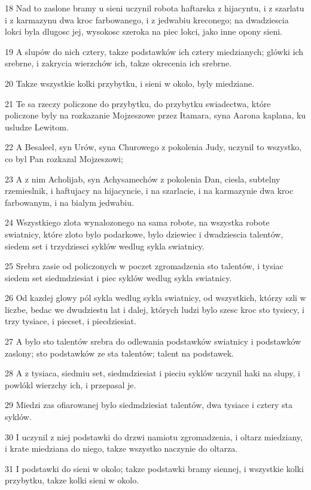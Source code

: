 \par 18 Nad to zaslone bramy u sieni uczynil robota haftarska z hijacyntu, i z szarlatu i z karmazynu dwa kroc farbowanego, i z jedwabiu kreconego; na dwadziescia lokci byla dlugosc jej, wysokosc szeroka na piec lokci, jako inne opony sieni.
\par 19 A slupów do nich cztery, takze podstawków ich cztery miedzianych; glówki ich srebrne, i zakrycia wierzchów ich, takze okrecenia ich srebrne.
\par 20 Takze wszystkie kolki przybytku, i sieni w okolo, byly miedziane.
\par 21 Te sa rzeczy policzone do przybytku, do przybytku swiadectwa, które policzone byly na rozkazanie Mojzeszowe przez Itamara, syna Aarona kaplana, ku usludze Lewitom.
\par 22 A Besaleel, syn Urów, syna Churowego z pokolenia Judy, uczynil to wszystko, co byl Pan rozkazal Mojzeszowi;
\par 23 A z nim Acholijab, syn Achysamechów z pokolenia Dan, ciesla, subtelny rzemieslnik, i haftujacy na hijacyncie, i na szarlacie, i na karmazynie dwa kroc farbowanym, i na bialym jedwabiu.
\par 24 Wszystkiego zlota wynalozonego na sama robote, na wszystka robote swiatnicy, które zloto bylo podarkowe, bylo dziewiec i dwadziescia talentów, siedem set i trzydziesci syklów wedlug sykla swiatnicy.
\par 25 Srebra zasie od policzonych w poczet zgromadzenia sto talentów, i tysiac siedem set siedmdziesiat i piec syklów wedlug sykla swiatnicy.
\par 26 Od kazdej glowy pól sykla wedlug sykla swiatnicy, od wszystkich, którzy szli w liczbe, bedac we dwudziestu lat i dalej, których ludzi bylo szesc kroc sto tysiecy, i trzy tysiace, i piecset, i piecdziesiat.
\par 27 A bylo sto talentów srebra do odlewania podstawków swiatnicy i podstawków zaslony; sto podstawków ze sta talentów; talent na podstawek.
\par 28 A z tysiaca, siedmiu set, siedmdziesiat i pieciu syklów uczynil haki na slupy, i powlókl wierzchy ich, i przepasal je.
\par 29 Miedzi zas ofiarowanej bylo siedmdziesiat talentów, dwa tysiace i cztery sta syklów.
\par 30 I uczynil z niej podstawki do drzwi namiotu zgromadzenia, i oltarz miedziany, i krate miedziana do niego, takze wszystko naczynie do oltarza.
\par 31 I podstawki do sieni w okolo; takze podstawki bramy siennej, i wszystkie kolki przybytku, takze kolki sieni w okolo.

